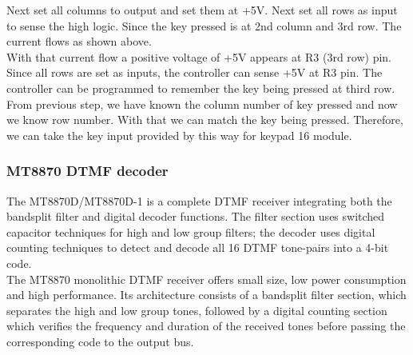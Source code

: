 \documentclass[a4paper]{article}
\begin{document}
\newline
\noindent
Next set all columns to output and set them at +5V. Next set all rows as input to sense the high logic. Since the key pressed is at 2nd column and 3rd row. The current flows as shown above.\\
With that current flow a positive voltage of +5V appears at R3 (3rd row) pin. Since all rows are set as inputs, the controller can sense +5V at R3 pin. The controller can be programmed to remember the key being pressed at third row.\\
From previous step, we have known the column number of key pressed and now we know row number. With that we can match the key being pressed. Therefore, we can take the key input provided by this way for keypad 16 module.

\subsubsection{MT8870 DTMF decoder}
The MT8870D/MT8870D-1 is a complete DTMF receiver integrating both the bandsplit filter and digital decoder functions. The filter section uses switched capacitor techniques for high and low group filters; the decoder uses digital counting techniques to detect and decode all 16 DTMF tone-pairs into a 4-bit code.\\
The MT8870 monolithic DTMF receiver offers small size, low power consumption and high
performance. Its architecture consists of a bandsplit filter section, which separates the high and low group tones, followed by a digital counting section which verifies the frequency and duration of the received tones before passing the corresponding code to the output bus. 
\end{document}
